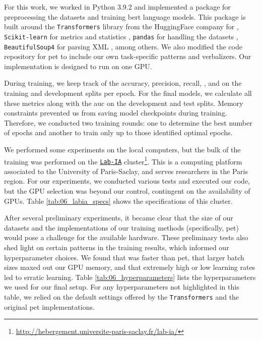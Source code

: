 \label{06_implementation_and_hardware}

For this work, we worked in Python 3.9.2 and implemented a package for preprocessing the datasets and training \gls{bert} language models. This package is built around the \texttt{Transformers} library from the  HuggingFace company  for \finetuning{} , \texttt{Scikit-learn} for metrics and statistics , \texttt{pandas} for handling the datasets , \texttt{BeautifulSoup4} for parsing XML , among others. We also modified the code repository for \gls{pet} to include our own task-specific patterns and verbalizers.  Our implementation is designed to run on one GPU.






During training, we keep track of the accuracy, precision, recall, \fOne{}, and \fTwo{} on the training and development splits per epoch. For the final models, we calculate all these metrics along with the \gls{auc} on the development and test splits. Memory constraints prevented us from saving model checkpoints during training. Therefore, we conducted two training rounds: one to determine the best number of epochs and another to train only up to those identified optimal epochs.



We performed some experiments on the \MAIAGE{} local computers, but the bulk of the training was performed on the \href{http://hebergement.universite-paris-saclay.fr/lab-ia/}{\texttt{Lab-IA}} cluster\footnote{\url{http://hebergement.universite-paris-saclay.fr/lab-ia/}}. This is a computing platform associated to the University of Paris-Saclay, and serves researchers in the Paris region. For our experiments, we conducted various tests and executed our code, but the GPU selection was beyond our control, contingent on the availability of GPUs. Table \ref{tab:06_labia_specs} shows the specifications of this cluster.







After several preliminary experiments, it became clear that the size of our datasets and the implementations of our training methods (specifically, \gls{pet}) would pose a challenge for the available hardware. 
These preliminary tests also shed light on certain patterns in the training results, which informed our hyperparameter choices.
We found that \finetuning{} was faster than \gls{pet}, that larger batch sizes maxed out our GPU memory, and that extremely high or low learning rates led to erratic learning.
Table \ref{tab:06_hyperparameters} lists the hyperparameters we used for our final setup.
For any hyperparameters not highlighted in this table, we relied on the default settings offered by the \texttt{Transformers} and the original \gls{pet} implementations.









